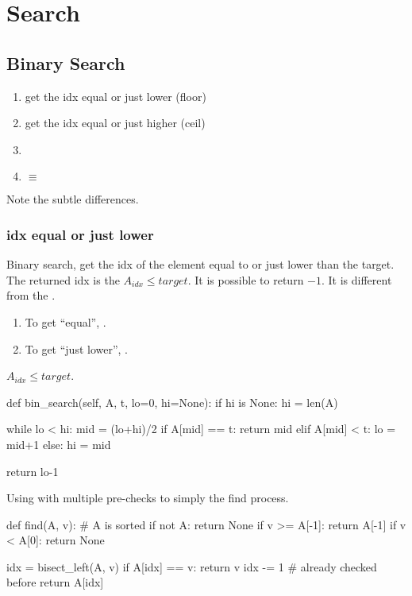 \chapter{Search}

\section{Binary Search}
\begin{enumerate}
\item get the idx equal or just lower (floor)
\item get the idx equal or just higher (ceil)
\item {}
\item {} $\equiv$  
\end{enumerate}

Note the subtle differences.

\subsection{idx equal or just lower}
Binary search, get the idx of the element equal to or just lower than the target. The returned idx is the $A_{idx} \leq target$. It is possible to return $-1$. It is different from the .

\begin{enumerate}
\item To get ``equal'', .
\item To get ``just lower'', .
\end{enumerate}
$A_{idx} \leq target$.
\begin{python}
def bin_search(self, A, t, lo=0, hi=None):
    if hi is None: hi = len(A)
    
    while lo < hi:
        mid = (lo+hi)/2
        if A[mid] == t:  return mid
        elif A[mid] < t: lo = mid+1
        else:            hi = mid

    return lo-1
\end{python}

Using  with multiple pre-checks to simply the find process.
\begin{python}
def find(A, v):
  # A is sorted 
  if not A:
    return None
  if v >= A[-1]:
    return A[-1]
  if v < A[0]:
    return None
    
  idx = bisect_left(A, v)
  if A[idx] == v:
    return v
  idx -= 1  # already checked before
  return A[idx]
\end{python}

